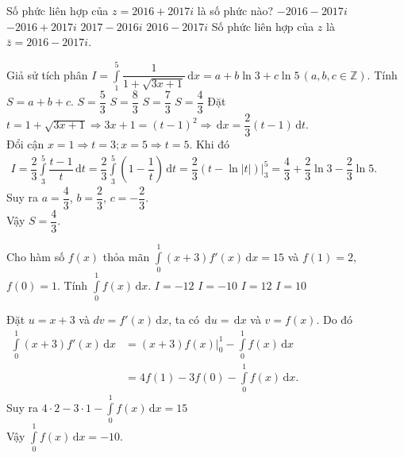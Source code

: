 \begin{ex}%
	Số phức liên hợp của $z=2016 + 2017 i$ là số phức nào?
	\choice
	{$-2016-2017i$}
	{$-2016+2017i$}
	{$2017-2016i$}
	{\True $2016-2017i$}
	\loigiai
	{
		Số phức liên hợp của $z$ là $\bar z=2016 - 2017 i$.
	}
\end{ex}
\begin{ex}%
	Giả sử tích phân $ \displaystyle I = \int\limits_{1}^{5} \dfrac{1}{1+\sqrt{3x+1}} \mathrm{\,d}x = a + b \ln 3 + c \ln 5 \, \left(a,b,c \in \mathbb{Z}\right)$. Tính $ S = a + b + c. $	
	\choice
	{$ S = \dfrac{5}{3} $}
	{$ S = \dfrac{8}{3} $}
	{$ S = \dfrac{7}{3} $}
	{\True $ S = \dfrac{4}{3} $}
	\loigiai
	{Đặt $ t = 1+\sqrt{3x+1} \Rightarrow 3x + 1 = \left(t-1\right)^2 \Rightarrow \mathrm{\,d}x = \dfrac{2}{3} \left(t-1\right) \mathrm{\,d}t$.\\
		Đổi cận $ x = 1 \Rightarrow t = 3; x = 5 \Rightarrow t = 5 $. Khi đó\\
		$	\begin{aligned}
		I = \dfrac{2}{3}\int\limits_{3}^{5} \dfrac{t-1}{t} \mathrm{\,d}t =\dfrac{2}{3}\int\limits_{3}^{5} \left(1-\dfrac{1}{t}\right) \mathrm{\,d}t =\dfrac{2}{3}\left(t - \ln \left|t \right|\right)\big|_3^5 = \dfrac{4}{3} + \dfrac{2}{3} \ln3 -\dfrac{2}{3} \ln 5.
		\end{aligned}
		$	\\
		Suy ra $ a = \dfrac{4}{3} $, $ b = \dfrac{2}{3} $, $ c = -\dfrac{2}{3} $. \\
		Vậy $ S = \dfrac{4}{3} $.
	}
\end{ex}
\begin{ex}%
	Cho hàm số $ f(x) $	thỏa mãn $ \displaystyle \int \limits_{0}^{1}(x+3)f'(x) \mathrm{\,d}x = 15 $ và $ f(1) = 2 $, $ f(0) = 1 $. Tính $ \displaystyle \int \limits_{0}^{1}f(x) \mathrm{\,d}x. $
	\choice
	{$ I = -12 $}
	{\True $ I = -10 $}
	{$ I  = 12 $}
	{$ I = 10 $}
	\loigiai
	{Đặt $ u = x + 3 $ và $dv = f'(x) \mathrm{\,d}x$, ta có $\mathrm{\,d}u =\mathrm{\,d}x$ và $v = f(x) $. Do đó\\
		$ \begin{aligned}
		\displaystyle \int \limits_{0}^{1}(x+3)f'(x) \mathrm{\,d}x &= (x+3)f(x) \big|_0^1 - \int \limits_{0}^{1}f(x) \mathrm{\,d}x \\&=4f(1) - 3f(0) - \int \limits_{0}^{1}f(x) \mathrm{\,d}x.
		\end{aligned} $	\\
		Suy ra $ 4 \cdot 2 - 3 \cdot 1 - \displaystyle \int \limits_{0}^{1}f(x) \mathrm{\,d}x = 15 $
		\\Vậy $ \displaystyle \int \limits_{0}^{1}f(x) \mathrm{\,d}x = -10. $
		
	}
\end{ex}
